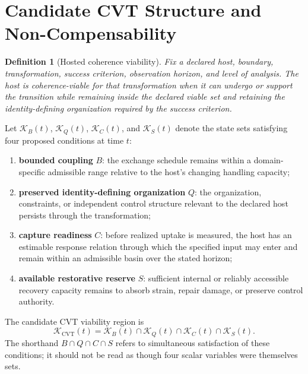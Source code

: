 \documentclass[11pt]{article}
\newtheorem{definition}{Definition}
\newcommand{\CVT}{\mathrm{CVT}}
\begin{document}
\section{Candidate CVT Structure and Non-Compensability}
\label{sec:candidate-structure}

\begin{definition}[Hosted coherence viability]
Fix a declared host, boundary, transformation, success criterion, observation horizon, and level of analysis. The host is coherence-viable for that transformation when it can undergo or support the transition while remaining inside the declared viable set and retaining the identity-defining organization required by the success criterion.
\end{definition}

Let \(\mathcal K_B(t)\), \(\mathcal K_Q(t)\), \(\mathcal K_C(t)\), and \(\mathcal K_S(t)\) denote the state sets satisfying four proposed conditions at time \(t\):
\begin{enumerate}[label=(\roman*)]
    \item \textbf{bounded coupling} \(B\): the exchange schedule remains within a domain-specific admissible range relative to the host's changing handling capacity;
    \item \textbf{preserved identity-defining organization} \(Q\): the organization, constraints, or independent control structure relevant to the declared host persists through the transformation;
    \item \textbf{capture readiness} \(C\): before realized uptake is measured, the host has an estimable response relation through which the specified input may enter and remain within an admissible basin over the stated horizon;
    \item \textbf{available restorative reserve} \(S\): sufficient internal or reliably accessible recovery capacity remains to absorb strain, repair damage, or preserve control authority.
\end{enumerate}

The candidate CVT viability region is
\begin{equation}
    \mathcal K_{\CVT}(t)
    =
    \mathcal K_B(t)
    \cap
    \mathcal K_Q(t)
    \cap
    \mathcal K_C(t)
    \cap
    \mathcal K_S(t).
    \label{eq:candidate-cvt-region}
\end{equation}
The shorthand \(B\cap Q\cap C\cap S\) refers to simultaneous satisfaction of these conditions; it should not be read as though four scalar variables were themselves sets.
\end{document}
